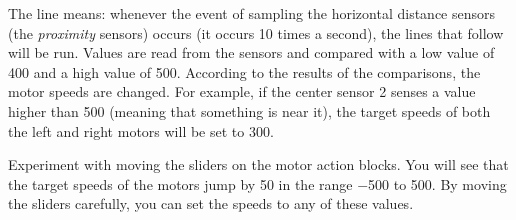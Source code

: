 The line  means: whenever the event of sampling the
horizontal distance sensors (the \emph{proximity} sensors) occurs (it
occurs 10 times a second), the lines that follow will be run. Values are
read from the sensors and compared with a low value of 400 and a high
value of 500. According to the results of the comparisons, the motor
speeds are changed. For example, if the center sensor 2 senses a value
higher than 500 (meaning that something is near it), the target speeds
of both the left and right motors will be set to 300.

Experiment with moving the sliders on the motor action blocks. You will
see that the target speeds of the motors jump by 50 in the range $-$500
to 500. By moving the sliders carefully, you can set the speeds to any
of these values.
